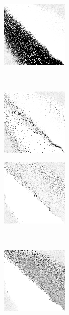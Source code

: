 
\begin{figure}
\center

	\begin{subfigure}[b]{0.4\textwidth}
		\includegraphics[height=0.23\textheight]{images/findings/round2/strats/winner/hand_max_min.png}
		\caption{\handmaxmin}
	\end{subfigure}
	~
	\begin{subfigure}[b]{0.4\textwidth}
		\includegraphics[height=0.23\textheight]{images/findings/round2/strats/winner/hand_max_avg.png}
		\caption{\handmaxavg}
	\end{subfigure}

	\begin{subfigure}[b]{0.4\textwidth}
		\includegraphics[height=0.23\textheight]{images/findings/round2/strats/winner/hand_max_med.png}
		\caption{\handmaxmed}
	\end{subfigure}
	~
	\begin{subfigure}[b]{0.4\textwidth}
		\includegraphics[height=0.23\textheight]{images/findings/round2/strats/winner/hand_max_poss.png}
		\caption{\handmaxposs}
	\end{subfigure}


\end{figure}
